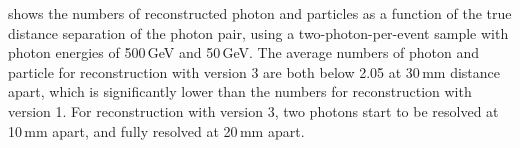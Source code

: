 
 shows the numbers of reconstructed photon and particles as a function of  the true distance separation of the photon pair, using a two-photon-per-event sample with photon energies of  500\,GeV and 50\,GeV.  The average numbers of photon and particle for reconstruction with \pandora version 3 are both below 2.05 at 30\,mm distance apart, which is significantly lower than the numbers for reconstruction with \pandora version 1. For reconstruction with \pandora version 3, two photons start to be resolved at 10\,mm apart, and fully resolved at 20\,mm apart.






